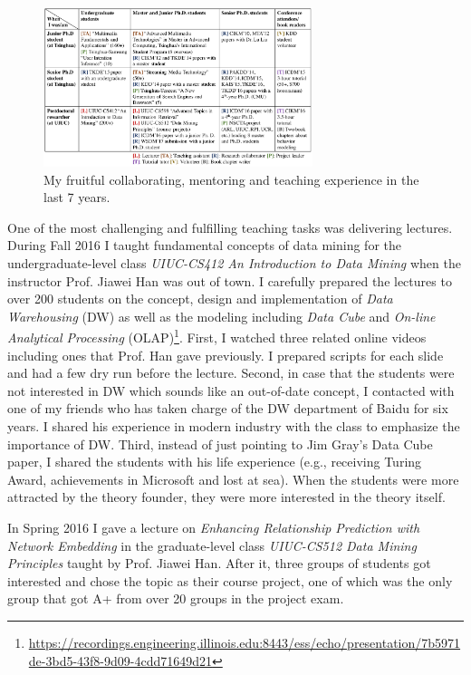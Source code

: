 \documentclass[10.5pt]{article}
\begin{document}
\vskip 0.12in
\vskip 0.02in

\begin{figure}
\vskip -0.45in
\includegraphics[width=0.7\textwidth]{figure/intro.pdf}
\vskip -0.18in
\caption{My fruitful collaborating, mentoring and teaching experience in the last 7 years.}
\label{fig:intro}
\vskip -0.12in
\end{figure}

\vskip 0.06in
\vskip 0.02in

One of the most challenging and fulfilling teaching tasks was delivering lectures. During Fall 2016 I taught fundamental concepts of data mining for the undergraduate-level class \textit{UIUC-CS412 An Introduction to Data Mining} when the instructor Prof. Jiawei Han was out of town. I carefully prepared the lectures to over 200 students on the concept, design and implementation of \textit{Data Warehousing} (DW) as well as the modeling including \textit{Data Cube} and \textit{On-line Analytical Processing} (OLAP)\footnote{\url{https://recordings.engineering.illinois.edu:8443/ess/echo/presentation/7b5971de-3bd5-43f8-9d09-4cdd71649d21}}. First, I watched three related online videos including ones that Prof. Han gave previously. I prepared scripts for each slide and had a few dry run before the lecture. Second, in case that the students were not interested in DW which sounds like an out-of-date concept, I contacted with one of my friends who has taken charge of the DW department of Baidu for six years. I shared his experience in modern industry with the class to emphasize the importance of DW. Third, instead of just pointing to Jim Gray's Data Cube paper, I shared the students with his life experience (e.g., receiving Turing Award, achievements in Microsoft and lost at sea). When the students were more attracted by the theory founder, they were more interested in the theory itself.

In Spring 2016 I gave a lecture on \textit{Enhancing Relationship Prediction with Network Embedding} in the graduate-level class \textit{UIUC-CS512 Data Mining Principles} taught by Prof. Jiawei Han. After it, three groups of students got interested and chose the topic as their course project, one of which was the only group that got A+ from over 20 groups in the project exam.
\end{document}
